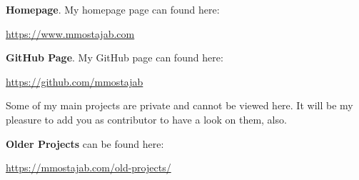 \documentclass[]{report}
\begin{document}
\textbf{Homepage}. My homepage page can found here:

\url{https://www.mmostajab.com}
 
\textbf{GitHub Page}. My GitHub page can found here:
 
\url{https://github.com/mmostajab}

Some of my main projects are private and cannot be viewed here. It will be my pleasure to add you as contributor to have a look on them, also.  
  
 
 \textbf{Older Projects} can be found here:
 
 \url{https://mmostajab.com/old-projects/}
 
 
\end{document}
